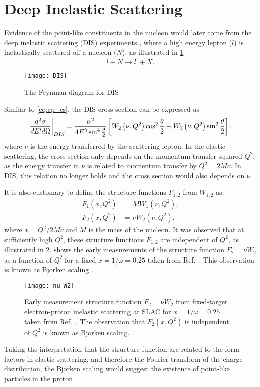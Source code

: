 \documentclass[../main.tex]{subfiles}
\begin{document}
\section{Deep Inelastic Scattering}
\label{sec:dis}
Evidence of the point-like constituents in the nucleon would later come from the deep
inelastic scattering (DIS) experiments \cite{breidenbach1969}, where a high
energy lepton ($l$) is inelastically scattered off a nucleon ($N$), as
illustrated in \cref{fig:DIS}
\begin{equation}
	l + N \rightarrow l^\prime + X.
\end{equation}
\begin{figure}[htbp!]
	\centering
	\texttt{[image: DIS]}
	\caption{The Feynman diagram for DIS}
	\label{fig:DIS}
\end{figure}
Similar to \cref{eq:ep_cs}, the DIS cross section can be expressed as
\begin{equation}
	\eval{\frac{d^2\sigma}{dE^\prime d\Omega}}_{DIS} = \frac{\alpha^2}{4E^2 \sin^4
		\frac{\theta}{2}} \left[ W_2\left(\nu,Q^2\right)\cos^2
		\frac{\theta}{2} + W_1\left(\nu,Q^2\right)\sin^2 \frac{\theta}{2}
		\right],
	\label{eq:DIS_cs1}
\end{equation}
where $\nu$ is the energy transferred by the scattering lepton.
In the elastic scattering, the cross section only depends on the momentum transfer squared $Q^2$,
as the energy transfer in $\nu$ is related to momentum transfer by $Q^2=2M\nu$.
In DIS, this relation no longer holds and the cross section would also depends on $\nu$.

It is also customary to define the structure functions $F_{1,2}$ from $W_{1,2}$ as:
\begin{equation}
	\begin{split}
		F_1\left(x,Q^2\right) &= MW_1\left(\nu,Q^2\right),\\
		F_2\left(x,Q^2\right) &= \nu W_2\left(\nu,Q^2\right),
	\end{split}
\end{equation}
where $x=Q^2/2M\nu$ and $M$ is the mass of the nucleon. It was observed that at sufficiently high $Q^2$,
these structure functions $F_{1,2}$ are independent of $Q^2$, as illustrated in
\cref{fig:w2}.  shows the early measurements of the
structure function $F_2=\nu W_2$ as a function of $Q^2$ for a fixed
$x=1/\omega=0.25$ taken from Ref.~\cite{friedman1972}. This observation is
known as Bjorken scaling \cite{bjorken1969}.
\begin{figure}[htpb!]
	\centering
	\texttt{[image: nu\_W2]}
	\caption{Early measurement structure function $F_2=\nu W_2$ from
		fixed-target electron-proton inelastic scattering at SLAC for
		$x=1/\omega=0.25$ taken from Ref.~\cite{friedman1972}. The observation
		that $F_2(x,Q^2)$ is independent of $Q^2$ is known as Bjorken scaling. }
	\label{fig:w2}
\end{figure}
Taking the interpretation that the structure function are related to the form factors in elastic scattering,
and therefore the Fourier transform of the charge distribution, the Bjorken scaling would suggest
the existence of point-like particles in the proton
\end{document}
